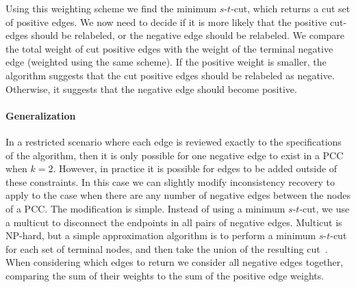 Using this weighting scheme we find the minimum $s$-$t$-cut, which returns a cut set of positive edges.
We now need to decide if it is more likely that the positive cut-edges should be relabeled, or the negative edge
  should be relabeled.
We compare the total weight of cut positive edges with the weight of the terminal negative edge (weighted using
  the same scheme).
If the positive weight is smaller, the algorithm suggests that the cut positive edges should be relabeled as
  negative.
Otherwise, it suggests that the negative edge should become positive.

\paragraph{Generalization}
In a restricted scenario where each edge is reviewed exactly to the specifications of the algorithm, then it is
  only possible for one negative edge to exist in a PCC when $k=2$.
However, in practice it is possible for edges to be added outside of these constraints.
In this case we can slightly modify inconsistency recovery to apply to the case when there are any number of
  negative edges between the nodes of a PCC.
The modification is simple.
Instead of using a minimum $s$-$t$-cut, we use a multicut to disconnect the endpoints in all pairs of negative
  edges.
Multicut is NP-hard, but a simple approximation algorithm is to perform a minimum $s$-$t$-cut for each set of
  terminal nodes, and then take the union of the resulting cut~\cite{vazirani_approximation_2013}.
When considering which edges to return we consider all negative edges together, comparing the sum of their
  weights to the sum of the positive edge weights.

